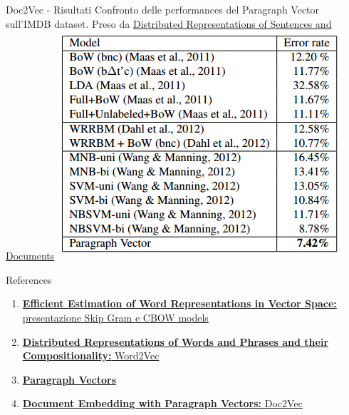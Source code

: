 \documentclass[british]{beamer}
\begin{document}
\begin{frame}{Doc2Vec - Risultati}
	Confronto delle performances del Paragraph Vector sull'IMDB dataset.
	Preso da \href{https://cs.stanford.edu/~quocle/paragraph_vector.pdf}{Distributed Representations of Sentences and Documents}
	\centering
	\includegraphics[width = 0.5\linewidth]{./Imgs/d2v-results.png}
\end{frame}

\begin{frame}{References}
	\begin{enumerate}
		\item \href{https://arxiv.org/pdf/1301.3781.pdf}{\textbf{Efficient Estimation of Word Representations in
			Vector Space:} presentazione Skip Gram e CBOW models}
		\item \href{https://papers.nips.cc/paper/5021-distributed-representations-of-words-and-phrases-and-their-compositionality.pdf}{\textbf{Distributed Representations of Words and Phrases
				and their Compositionality:} Word2Vec}
		\item \href{https://cs.stanford.edu/~quocle/paragraph_vector.pdf}{\textbf{Paragraph Vectors}}
		\item \href{https://arxiv.org/pdf/1507.07998.pdf}{\textbf{Document Embedding with Paragraph Vectors:} Doc2Vec}
	\end{enumerate}
\end{frame}
\end{document}

